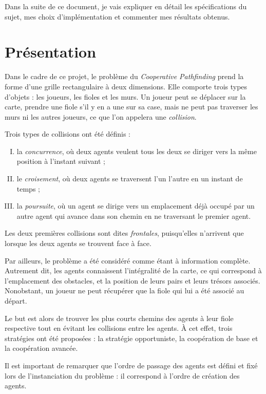\documentclass[letterpaper]{article}
\begin{document}
Dans la suite de ce document, je vais expliquer en d\'etail les sp\'ecifications du sujet, mes choix d'impl\'ementation et commenter mes r\'esultats obtenus.

\section{Pr\'esentation}
Dans le cadre de ce projet, le probl\`eme du \textit{Cooperative Pathfinding} prend la forme d'une grille rectangulaire \`a deux dimensions.
Elle comporte trois types d'objets : les joueurs, les fioles et les murs.
Un joueur peut se d\'eplacer sur la carte, prendre une fiole s'il y en a une sur sa case, mais ne peut pas traverser les murs ni les autres joueurs, ce que l'on appelera une \textit{collision}.

Trois types de collisions ont \'et\'e d\'efinis :
\begin{enumerate}[(I)]
 \item la \textit{concurrence}, o\`u deux agents veulent tous les deux se diriger vers la m\^eme position \`a l'instant suivant ;
 \item le \textit{croisement}, o\`u deux agents se traversent l'un l'autre en un instant de temps ;
 \item la \textit{poursuite}, o\`u un agent se dirige vers un emplacement d\'ej\`a occup\'e par un autre agent qui avance dans son chemin en ne traversant le premier agent. 
\end{enumerate}
Les deux premi\`eres collisions sont dites \textit{frontales}, puisqu'elles n'arrivent que lorsque les deux agents se trouvent face \`a face.

Par ailleurs, le probl\`eme a \'et\'e consid\'er\'e comme \'etant \`a information compl\`ete. 
Autrement dit, les agents connaissent l'int\'egralit\'e de la carte, ce qui correspond \`a l'emplacement des obstacles, et la position de leurs pairs et leurs tr\'esors associ\'es.
Nonobstant, un joueur ne peut r\'ecup\'erer que la fiole qui lui a \'et\'e associ\'e au d\'epart.

Le but est alors de trouver les plus courts chemins des agents \`a leur fiole respective tout en \'evitant les collisions entre les agents.
\`A cet effet, trois strat\'egies ont \'et\'e propos\'ees : la strat\'egie opportuniste, la coop\'eration de base et la coop\'eration avanc\'ee.

Il est important de remarquer que l'ordre de passage des agents est d\'efini et fix\'e lors de l'instanciation du probl\`eme : il correspond \`a l'ordre de cr\'eation des agents.
\end{document}
